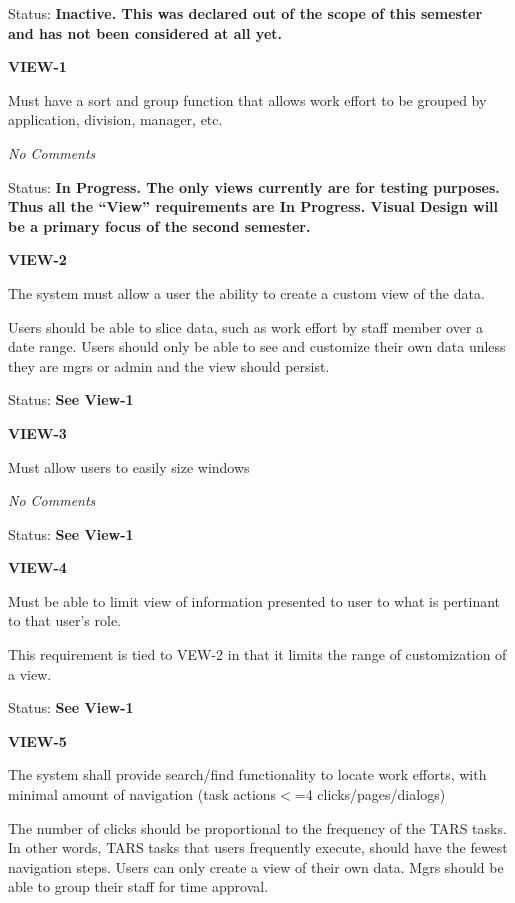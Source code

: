 \documentclass{article}
\begin{document}
\noindent Status: \textbf{Inactive.   This was declared out of the scope of this semester and has not been considered at all yet.}

\noindent 

\noindent \textbf{VIEW-1}

\noindent Must have a sort and group function that allows work effort to be grouped by application, division, manager, etc.

 \textit{No Comments}

\noindent Status: \textbf{In Progress.  The only views currently are for testing purposes.  Thus all the ``View'' requirements are In Progress.  Visual Design will be a primary focus of the second semester.}\textit{ }

\noindent \textit{}

\noindent \textbf{VIEW-2}

\noindent The system must allow a user the ability to create a custom view of the data.

\noindent Users should be able to slice data, such as work effort by staff member over a date range. Users should only be able to see and customize their own data unless they are mgrs or admin and the view should persist.

Status: \textbf{See View-1}

\noindent 

\noindent \textbf{VIEW-3}

\noindent Must allow users to easily size windows

 \textit{No Comments}

\textit{ }Status: \textbf{See View-1}\textit{}

\noindent 

\noindent \textbf{VIEW-4}

\noindent Must be able to limit view of information presented to user to what is pertinant to that user's role.

This requirement is tied to VEW-2 in that it limits the range of customization of a view.

Status: \textbf{See View-1}

\noindent 

\noindent \textbf{VIEW-5}

\noindent The system shall provide search/find functionality to locate work efforts, with minimal amount of navigation (task actions$<$=4 clicks/pages/dialogs)

\noindent The number of clicks should be proportional to the frequency of the TARS tasks. In other words, TARS tasks that users frequently execute, should have the fewest navigation steps. Users can only create a view of their own data. Mgrs should be able to group their staff for time approval.
\end{document}
